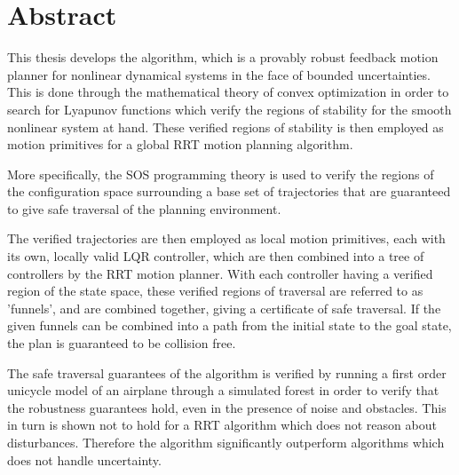 \chapter*{Abstract}

\abstractintoc{} %
\abstractnum %


This thesis develops the \rrtfunnel{} algorithm, which is a provably robust
feedback motion planner for nonlinear dynamical systems in the face of bounded
uncertainties. This is done through the mathematical theory of convex
optimization in order to search for Lyapunov functions which verify the
regions of stability for the smooth nonlinear system at hand. These verified
regions of stability is then employed as motion primitives for a global
\ac{RRT} motion planning algorithm.

More specifically, the \ac{SOS} programming theory is used to verify the
regions of the configuration space surrounding a base set of trajectories that
are guaranteed to give safe traversal of the planning environment.

The verified trajectories are then employed as local motion primitives, each
with its own, locally valid \ac{LQR} controller, which are then combined into
a tree of controllers by the \ac{RRT} motion planner. With each controller
having a verified region of the state space, these verified regions of
traversal are referred to as 'funnels', and are combined together, giving a
certificate of safe traversal. If the given funnels can be combined into a
path from the initial state to the goal state, the plan is guaranteed to be
collision free.

The safe traversal guarantees of the algorithm is verified by running a first
order unicycle model of an airplane through a simulated forest in order to
verify that the robustness guarantees hold, even in the presence of noise and
obstacles. This in turn is shown not to hold for a \ac{RRT} algorithm which does
not reason about disturbances. Therefore the \rrtfunnel{} algorithm
significantly outperform algorithms which does not handle uncertainty.


